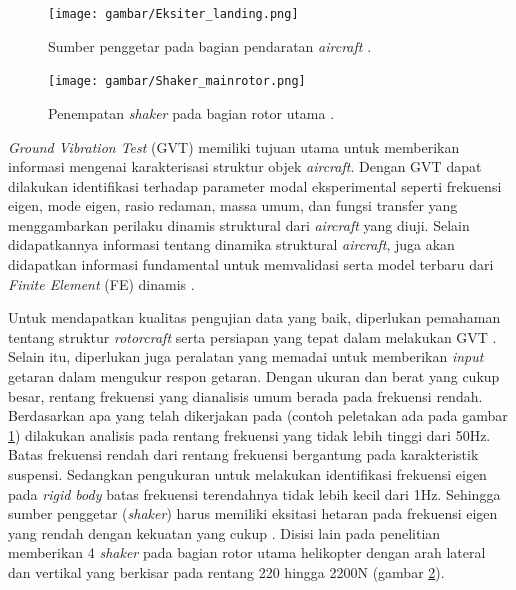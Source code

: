 \begin{figure}[H]
	\centering
	\texttt{[image: gambar/Eksiter\_landing.png]}
	\caption{Sumber penggetar pada bagian pendaratan \textit{aircraft} \cite{lubrina:hal-01059708}.}
	\label{fig:shaker_landing}
\end{figure}

\begin{figure}[H]
	\centering
	\texttt{[image: gambar/Shaker\_mainrotor.png]}
	\caption{Penempatan \textit{shaker} pada bagian rotor utama \cite{Ciavarella2018AnEH}.}
	\label{fig:shaker_rotor}
\end{figure}

\textit{Ground Vibration Test} (GVT) memiliki tujuan utama untuk memberikan informasi mengenai karakterisasi struktur objek \textit{aircraft}. Dengan GVT dapat dilakukan identifikasi terhadap parameter modal eksperimental seperti frekuensi eigen, mode eigen, rasio redaman, massa umum, dan fungsi transfer yang menggambarkan perilaku dinamis struktural dari \textit{aircraft} yang diuji. Selain didapatkannya informasi tentang dinamika struktural \textit{aircraft}, juga akan didapatkan informasi fundamental untuk memvalidasi serta model terbaru dari \textit{Finite Element} (FE) dinamis \cite{Ciavarella2018AnEH}.

Untuk mendapatkan kualitas pengujian data yang baik, diperlukan pemahaman tentang struktur \textit{rotorcraft} serta persiapan yang tepat dalam melakukan GVT \cite{Ciavarella2018AnEH}. Selain itu, diperlukan juga peralatan yang memadai untuk memberikan \textit{input} getaran dalam mengukur respon getaran. Dengan ukuran dan berat yang cukup besar, rentang frekuensi yang dianalisis umum berada pada frekuensi rendah. Berdasarkan apa yang telah dikerjakan pada \cite{lubrina:hal-01059708} (contoh peletakan ada pada gambar \ref{fig:shaker_landing}) dilakukan analisis pada rentang frekuensi yang tidak lebih tinggi dari 50Hz. Batas frekuensi rendah dari rentang frekuensi bergantung pada karakteristik suspensi. Sedangkan pengukuran untuk melakukan identifikasi frekuensi eigen pada \textit{rigid body} batas frekuensi terendahnya tidak lebih kecil dari 1Hz. Sehingga sumber penggetar (\textit{shaker}) harus memiliki eksitasi hetaran pada frekuensi eigen yang rendah dengan kekuatan yang cukup \cite{lubrina:hal-01059708}. Disisi lain pada penelitian \cite{Ciavarella2018AnEH} memberikan 4 \textit{shaker} pada bagian rotor utama helikopter dengan arah lateral dan vertikal yang berkisar pada rentang 220 hingga 2200N (gambar \ref{fig:shaker_rotor}).

